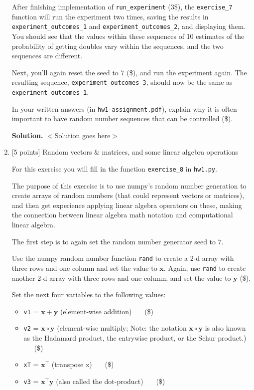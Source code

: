 \documentclass[10pt]{article}
\begin{document}
\begin{enumerate}
After finishing implementation of {\tt run\_experiment} (3\$), the {\tt exercise\_7} function will run the experiment two times, saving the results in {\tt experiment\_outcomes\_1} and {\tt experiment\_outcomes\_2}, and displaying them. You should see that the values within these sequences of 10 estimates of the probability of getting doubles vary within the sequences, and the two sequences are different.

Next, you'll again reset the seed to $7$ (\$), and run the experiment again. The resulting sequence, {\tt experiment\_outcomes\_3}, should now be the same as {\tt experiment\_outcomes\_1}.

In your written answers (in {\tt hw1-assignment.pdf}), explain why it is often important to have random number sequences that can be controlled (\$).

{\bf Solution.} $<$Solution goes here$>$\\


\item \label{prob:8} [5 points] Random vectors \& matrices, and some linear algebra operations

For this exercise you will fill in the function {\tt exercise\_8} in {\tt hw1.py}.

The purpose of this exercise is to use numpy's random number generation to create arrays of random numbers (that could represent vectors or matrices), and then get experience applying linear algebra operators on these, making the connection between linear algebra math notation and computational linear algebra.

The first step is to again set the random number generator seed to $7$.

Use the numpy random number function {\tt rand} to create a 2-d array with three rows and one column and set the value to $\mathbf{x}$. Again, use {\tt rand} to create another 2-d array with three rows and one column, and set the value to $\mathbf{y}$ (\$).

Set the next four variables to the following values:
\begin{itemize}
\item {\tt v1} = $\mathbf{x} + \mathbf{y}$ (element-wise addition) ~~~(\$)
\item {\tt v2} = $\mathbf{x} \circ \mathbf{y}$ (element-wise multiply; Note: the notation $\mathbf{x} \circ \mathbf{y}$ is also known as the Hadamard product, the entrywise product, or the Schur product.) ~~~(\$)
\item {\tt xT} = $\mathbf{x}^\top$ (transpose x) ~~~(\$)
\item {\tt v3} = $\mathbf{x}^\top \mathbf{y}$  (also called the dot-product) ~~~(\$)
\end{itemize}


\end{enumerate}
\end{document}
